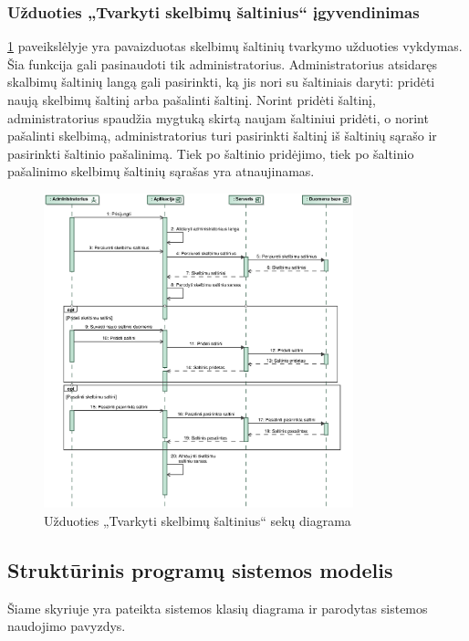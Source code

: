 \documentclass[12pt]{article}
\begin{document}
	\pagebreak
	
	\subsubsection{Užduoties „Tvarkyti skelbimų šaltinius“ įgyvendinimas}
	\ref{ManSouSeq} paveikslėlyje yra pavaizduotas skelbimų šaltinių tvarkymo užduoties vykdymas. Šia funkcija gali pasinaudoti tik administratorius. Administratorius atsidaręs skalbimų šaltinių langą gali pasirinkti, ką jis nori su šaltiniais daryti: pridėti naują skelbimų šaltinį arba pašalinti šaltinį. Norint pridėti šaltinį, administratorius spaudžia mygtuką skirtą naujam šaltiniui pridėti, o norint pašalinti skelbimą, administratorius turi pasirinkti šaltinį iš šaltinių sąrašo ir pasirinkti šaltinio pašalinimą. Tiek po šaltinio pridėjimo, tiek po šaltinio pašalinimo skelbimų šaltinių sąrašas yra atnaujinamas.
	\begin{figure}[h]
		\begin{center}
			\includegraphics[width=0.8\textwidth]{TvarkytiSkelbimuSaltinius.eps}
			\caption{Užduoties „Tvarkyti skelbimų šaltinius“ sekų diagrama\label{ManSouSeq}}
		\end{center}
	\end{figure}

	\pagebreak
	
	\subsection{Struktūrinis programų sistemos modelis}
	Šiame skyriuje yra pateikta sistemos klasių diagrama ir parodytas sistemos naudojimo pavyzdys.
\end{document}
